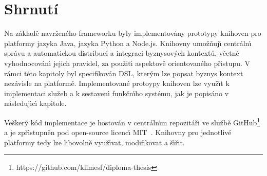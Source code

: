 \section{Shrnutí}

Na základě navrženého frameworku byly implementovány prototypy
knihoven pro platformy jazyka Java, jazyka Python a
Node.js. Knihovny umožňuj\'{\i} centráln\'{\i} správu a automatickou distribuci a integraci
byznysov\'ych kontextů, včetně vyhodnocován\'{\i} jejich pravidel, za
použit\'{\i} aspektově orientovaného př\'{\i}stupu.
V rámci této kapitoly byl specifikován \gls{DSL}, kter\'ym lze popsat
byznys kontext nezávisle na platformě.
Implementované protoypy knihoven lze využ\'{\i}t k implementaci služeb a k sestaven\'{\i}
funkčn\'{\i}ho systému, jak je popisáno v následuj\'{\i}c\'{\i} kapitole.

Vešker\'y kód implementace je hostován v centráln\'{\i}m repozitáři
ve službě GitHub\footnote{https://github.com/klimesf/diploma-thesis}
a je zpř\'{\i}stupněn pod open-source licenc\'{\i} \gls{MIT}~\cite{mitlicense}.
Knihovny pro jednotlivé platformy tedy lze libovolně
využ\'{\i}vat, modifikovat a š\'{\i}řit.
